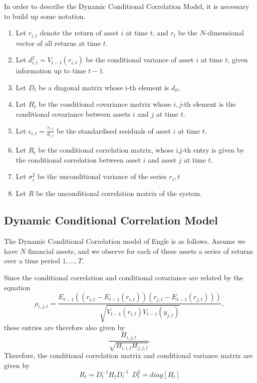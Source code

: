 \documentclass{article} %
\numberwithin{equation}{section} %
\numberwithin{figure}{section} %
\numberwithin{table}{section} %
\begin{document}
In order to describe the Dynamic Conditional Correlation Model, it is necessary to build up some notation.
\begin{enumerate}
  \item Let $r_{i,t}$ denote the return of asset $i$ at time $t$, and $r_t$ be the $N$-dimensional vector of all returns at time $t$.
  \item Let $d_{i,t}^2 = V_{t-1}(r_{i,t})$ be the conditional variance of asset $i$ at time $t$, given information up to time $t-1$.
  \item Let $D_t$ be a diagonal matrix whose i-th element is $d_{it}$.
  \item Let $H_t$ be the conditional covariance matrix whose $i,j$-th element is the conditional covariance between assets $i$ and $j$ at time $t$.
  \item Let $\epsilon_{i,t} = \frac{r_{i,t}}{d_{i,t}}$ be the standardised residuals of asset $i$ at time $t$.
  \item Let $R_t$ be the conditional correlation matrix, whose i,j-th entry is given by the conditional correlation between asset $i$ and asset $j$ at time $t$.
  \item Let $\sigma_i^2$ be the unconditional variance of the series $r_i,t$
  \item Let $R$ be the unconditional correlation matrix of the system.
\end{enumerate}


\subsection{Dynamic Conditional Correlation Model}

The Dynamic Conditional Correlation model of Engle \cite{engle2002} is as follows. Assume we have $N$ financial assets, and we observe for each of these assets a series of returns over a time period $1, \ldots , T$.

Since the conditional correlation and conditional covariance are related by the equation
\begin{equation}
  \rho_{i,j,t} = \frac{E_{t-1}((r_{i,t} - E_{t-1}(r_{i,t}))(r_{j,t} - E_{t-1}(r_{j,t})))}
                      {\sqrt{V_{t-1}(r_{i,t})V_{t-1}(y_{j,t})}},
\end{equation}
these entries are therefore also given by
\begin{equation}
  \frac{H_{i,j,t}}{\sqrt{H_{i,i,t}H_{j,j,t}}}.
\end{equation}
Therefore, the conditional correlation matrix and conditional variance matrix are given by
\begin{equation}
  R_t = D_t^{-1} H_t D_t ^{-1} \ \  D_t ^2 = diag[H_t]
\end{equation}
\end{document}

